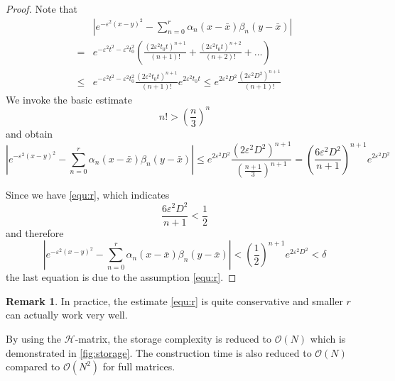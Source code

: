 \documentclass[10pt,a4paper]{article}
\theoremstyle{definition}
\newtheorem{remark}{Remark}
\begin{document}
\begin{proof}
	Note that 
	\begin{align}
		&|{e^{ - {\varepsilon ^2}{{(x - y)}^2}}} - \sum\limits_{n = 0}^r {{\alpha _n}} (x - \bar x){\beta _n}(y - \bar x)|\\
		 =&  {e^{ - {\varepsilon ^2}{t^2} - {\varepsilon ^2}t_0^2}}\left( {\frac{{{{(2{\varepsilon ^2}{t_0}t)}^{n + 1}}}}{{(n + 1)!}} + \frac{{{{(2{\varepsilon ^2}{t_0}t)}^{n + 2}}}}{{(n + 2)!}} +  \ldots } \right)\\
		\le& {e^{ - {\varepsilon ^2}{t^2} - {\varepsilon ^2}t_0^2}}\frac{{{{(2{\varepsilon ^2}{t_0}t)}^{n + 1}}}}{{(n + 1)!}}{e^{2{\varepsilon ^2}{t_0}t}} \le {e^{2{\varepsilon ^2}{D^2}}}\frac{{{{(2{\varepsilon ^2}{D^2})}^{n + 1}}}}{{(n + 1)!}}
	\end{align}
	We invoke the basic estimate
	\begin{equation}
		n!>\left( \frac{n}{3} \right)^{n}
	\end{equation} 
	and obtain
	\begin{equation}
		|{e^{ - {\varepsilon ^2}{{(x - y)}^2}}} - \sum\limits_{n = 0}^r {{\alpha _n}} (x - \bar x){\beta _n}(y - \bar x)|\leq {e^{2{\varepsilon ^2}{D^2}}}\frac{{{{(2{\varepsilon ^2}{D^2})}^{n + 1}}}}{{{{\left( {\frac{{n + 1}}{3}} \right)}^{n + 1}}}} = {\left( {\frac{{6{\varepsilon ^2}{D^2}}}{{n + 1}}} \right)^{n + 1}}{e^{2{\varepsilon ^2}{D^2}}}
	\end{equation}
	
	Since we have \cref{equ:r}, which indicates 
	\begin{equation}
		{\frac{{6{\varepsilon ^2}{D^2}}}{{n + 1}}}<\frac{1}{2}
	\end{equation}
	and therefore
	\begin{equation}
		|{e^{ - {\varepsilon ^2}{{(x - y)}^2}}} - \sum\limits_{n = 0}^r {{\alpha _n}} (x - \bar x){\beta _n}(y - \bar x)| < {\left( {\frac{1}{2}} \right)^{n + 1}}{e^{2{\varepsilon ^2}{D^2}}} < \delta 
	\end{equation}
	the last equation is due to the assumption \cref{equ:r}.
\end{proof}

\begin{remark}
	In practice, the estimate \cref{equ:r} is quite conservative and smaller $r$ can actually work very well. 
\end{remark}

By using the $\mathcal{H}$-matrix, the storage complexity is reduced to $\mathcal{O}(N)$ which is demonstrated in \cref{fig:storage}. The construction time is also reduced to $\mathcal{O}(N)$ compared to $\mathcal{O}(N^2)$ for full matrices. 
\end{document}
